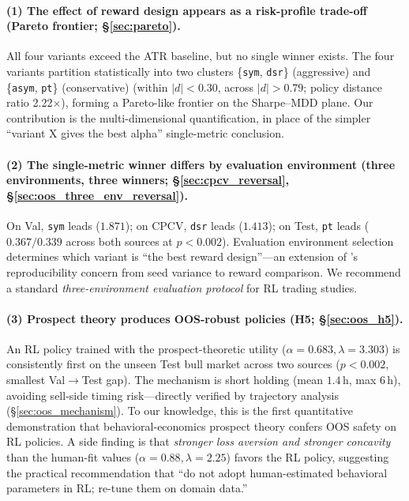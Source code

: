 \documentclass[11pt, a4paper]{article}
\begin{document}
\paragraph{(1) The effect of reward design appears as a risk-profile
trade-off (Pareto frontier; \S\ref{sec:pareto}).}
All four variants exceed the ATR baseline, but no single winner exists. The
four variants partition statistically into two clusters \{\texttt{sym},
\texttt{dsr}\} (aggressive) and \{\texttt{asym}, \texttt{pt}\} (conservative)
(within $|d|<0.30$, across $|d|>0.79$; policy distance ratio 2.22$\times$),
forming a Pareto-like frontier on the Sharpe--MDD plane. Our contribution is
the multi-dimensional quantification, in place of the simpler ``variant X
gives the best alpha'' single-metric conclusion.

\paragraph{(2) The single-metric winner differs by evaluation environment
(three environments, three winners;
\S\ref{sec:cpcv_reversal}, \S\ref{sec:oos_three_env_reversal}).}
On Val, \texttt{sym} leads ($1.871$); on CPCV, \texttt{dsr} leads ($1.413$);
on Test, \texttt{pt} leads ($0.367 / 0.339$ across both sources at $p<0.002$).
Evaluation environment selection determines which variant is ``the best
reward design''---an extension of \citet{henderson2018rlreproducibility}'s
reproducibility concern from seed variance to reward comparison. We
recommend a standard \emph{three-environment evaluation protocol} for RL
trading studies.

\paragraph{(3) Prospect theory produces OOS-robust policies (H5;
\S\ref{sec:oos_h5}).}
An RL policy trained with the \citet{kahneman1979prospect} prospect-theoretic
utility ($\alpha=0.683, \lambda=3.303$) is consistently first on the unseen
Test bull market across two sources ($p<0.002$, smallest Val$\to$Test gap).
The mechanism is short holding (mean $1.4$\,h, max $6$\,h), avoiding
sell-side timing risk---directly verified by trajectory analysis
(\S\ref{sec:oos_mechanism}). To our knowledge, this is the first
quantitative demonstration that behavioral-economics prospect theory confers
OOS safety on RL policies. A side finding is that
\emph{stronger loss aversion and stronger concavity} than the human-fit
values ($\alpha=0.88, \lambda=2.25$) favors the RL policy, suggesting the
practical recommendation that ``do not adopt human-estimated behavioral
parameters in RL; re-tune them on domain data.''
\end{document}
